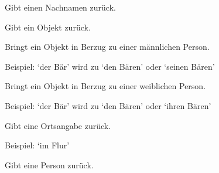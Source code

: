 \documentclass[a4paper,12pt,oneside]{sphinxmanual}
\begin{document}

\begin{fulllineitems}
\label{funktionen:pyzufall.nachname}
Gibt einen Nachnamen zurück.

\end{fulllineitems}


\begin{fulllineitems}
\label{funktionen:pyzufall.objekt}
Gibt ein Objekt zurück.

\end{fulllineitems}


\begin{fulllineitems}
\label{funktionen:pyzufall.objekt_m}
Bringt ein Objekt in Berzug zu einer männlichen Person.

Beispiel:
`der Bär' wird zu `den Bären' oder `seinen Bären'

\end{fulllineitems}


\begin{fulllineitems}
\label{funktionen:pyzufall.objekt_w}
Bringt ein Objekt in Berzug zu einer weiblichen Person.

Beispiel:
`der Bär' wird zu `den Bären' oder `ihren Bären'

\end{fulllineitems}


\begin{fulllineitems}
\label{funktionen:pyzufall.ort}
Gibt eine Ortsangabe zurück.

Beispiel: `im Flur'

\end{fulllineitems}


\begin{fulllineitems}
\label{funktionen:pyzufall.person}
Gibt eine Person zurück.

\end{fulllineitems}
\end{document}
